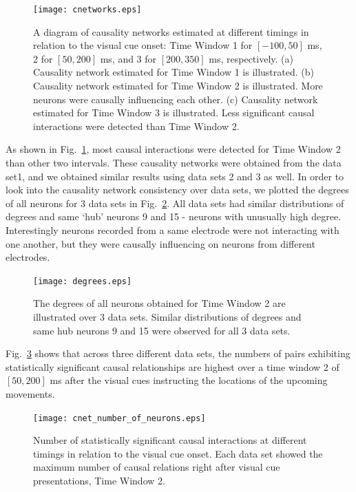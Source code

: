 \documentclass[a4paper]{jpconf}
\begin{document}
\begin{figure}[ht!]
\begin{center}
\texttt{[image: cnetworks.eps]}
\end{center}
\caption{A diagram of causality networks estimated at different
timings in relation to the visual cue onset: Time Window 1 for
$[-100, 50]$ ms, 2 for $[50, 200]$ ms, and 3 for $[200, 350]$ ms,
respectively. (a) Causality network estimated for Time Window 1 is
illustrated. (b) Causality network estimated for Time Window 2 is
illustrated. More neurons were causally influencing each other.
(c) Causality network estimated for Time Window 3 is illustrated.
Less significant causal interactions were detected than Time
Window 2.} \label{fig:cnetwork}
\end{figure}

As shown in Fig.~\ref{fig:cnetwork}, most causal interactions were
detected for Time Window 2 than other two intervals. These
causality networks were obtained from the data set1, and we
obtained similar results using data sets 2 and 3 as well. In order
to look into the causality network consistency over data sets, we
plotted the degrees of all neurons for 3 data sets in
Fig.~\ref{fig:degree}.  All data sets had similar distributions of
degrees and same `hub' neurons 9 and 15 - neurons with unusually
high degree. Interestingly neurons recorded from a same electrode
were not interacting with one another, but they were causally
influencing on neurons from different electrodes.

\begin{figure}[ht!]
\begin{center}
\texttt{[image: degrees.eps]}
\end{center}
\caption{The degrees of all neurons obtained for Time Window 2 are
illustrated over 3 data sets. Similar distributions of degrees and
same hub neurons 9 and 15 were observed for all 3 data sets.}
\label{fig:degree}
\end{figure}

Fig.~\ref{fig:num_neurons} shows that across three different data
sets, the numbers of pairs exhibiting statistically significant
causal relationships are highest over a time window 2 of $[50, 200]$
ms after the visual cues instructing the locations of the upcoming
movements.

\begin{figure}[ht!]
\begin{center}
\texttt{[image: cnet\_number\_of\_neurons.eps]}
\end{center}
\caption{Number of statistically significant causal interactions
at different timings in relation to the visual cue onset. Each
data set showed the maximum number of causal relations right after
visual cue presentations, Time Window 2.} \label{fig:num_neurons}
\end{figure}
\end{document}
